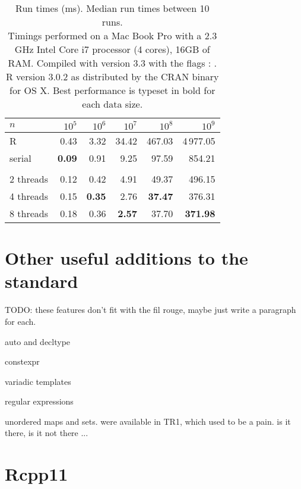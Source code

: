 \begin{table}
\centering
\begin{tabular}{lrrrrr}
\toprule
$n$ & $10^5$ & $10^6$ & $10^7$ & $10^8$ & $10^9$ \\
\midrule
R         & 0.43          & 3.32  & 34.42 & 467.03 & 4\,977.05 \\
serial    & \textbf{0.09} & 0.91  &  9.25 &  97.59 &    854.21 \\
\hspace{1.5cm} &
\hspace{1.5cm} &
\hspace{1.5cm} &
\hspace{1.5cm} &
\hspace{1.5cm} &
\hspace{1.5cm} \\
2 threads & 0.12          & 0.42          & 4.91          &  49.37          & 496.15          \\
4 threads & 0.15          & \textbf{0.35} & 2.76          &  \textbf{37.47} & 376.31          \\
8 threads & 0.18          & 0.36          & \textbf{2.57} &  37.70          & \textbf{371.98} \\
\bottomrule
\end{tabular}
\caption{\label{table:count}Run times (ms). Median run times between 10 runs.\\
{\footnotesize Timings performed on a Mac Book Pro with a 2.3 GHz Intel Core i7 processor (4 cores), 16GB of RAM.
Compiled with  version 3.3 with the flags : . R version 3.0.2
as distributed by the CRAN binary for OS X. Best performance is typeset in bold for each data size. }}
\end{table}

\section{Other useful additions to the standard}

TODO:
these features don't fit with the fil rouge, maybe just write a paragraph for each.

auto and decltype

constexpr

variadic templates

regular expressions

unordered maps and sets. were available in TR1, which used to be a pain. is it there, is it not there ...

\section{Rcpp11}

